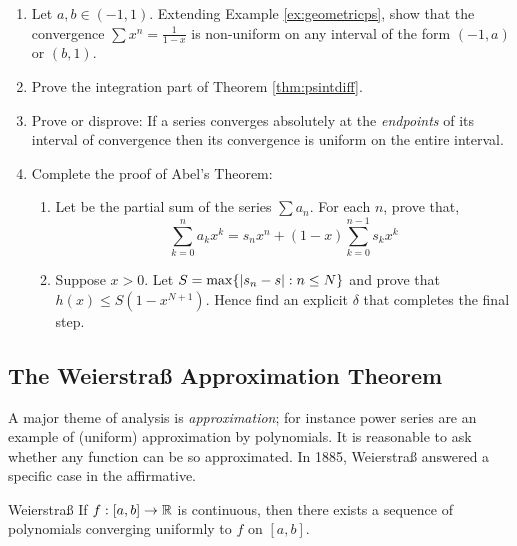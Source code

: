 \begin{exercises}
\begin{enumerate}
	 
		\item Let $a,b\in(-1,1)$. Extending Example \ref{ex:geometricps}, show that the convergence $\sum x^n=\frac 1{1-x}$ is non-uniform on any interval of the form $(-1,a)$ or $(b,1)$.
		
		
		\item\label{ex:psintegralproof} Prove the integration part of Theorem \ref{thm:psintdiff}.
		
		
		\item Prove or disprove: If a series converges absolutely at the \emph{endpoints} of its interval of convergence then its convergence is uniform on the entire interval.
	 
	 
	 	\item Complete the proof of Abel's Theorem:
	 	\begin{enumerate}
	   	\item Let  be the partial sum of the series $\sum a_n$. For each $n$, prove that,
	   	\[
	   		\sum_{k=0}^na_kx^k =s_nx^n+(1-x)\sum_{k=0}^{n-1}s_kx^k
	   	\]
	   	\item Suppose $x>0$. Let $S=\max\{\left| s_n-s\right|:n\le N\}$ and prove that $h(x)\le S(1-x^{N+1})$. Hence find an explicit $\delta$ that completes the final step.
		\end{enumerate}
		
		
	\end{enumerate}
\end{exercises}


\clearpage



\subsection{The Weierstraß Approximation Theorem}

A major theme of analysis is \emph{approximation}; for instance power series are an example of (uniform) approximation by polynomials. It is reasonable to ask whether any function can be so approximated. In 1885, Weierstraß answered a specific case in the affirmative.


\begin{thm}{Weierstraß}{}
	If $f:[a,b]\to\mathbb{R}$ is continuous, then there exists a sequence of polynomials converging uniformly to $f$ on $[a,b]$.
\end{thm}

